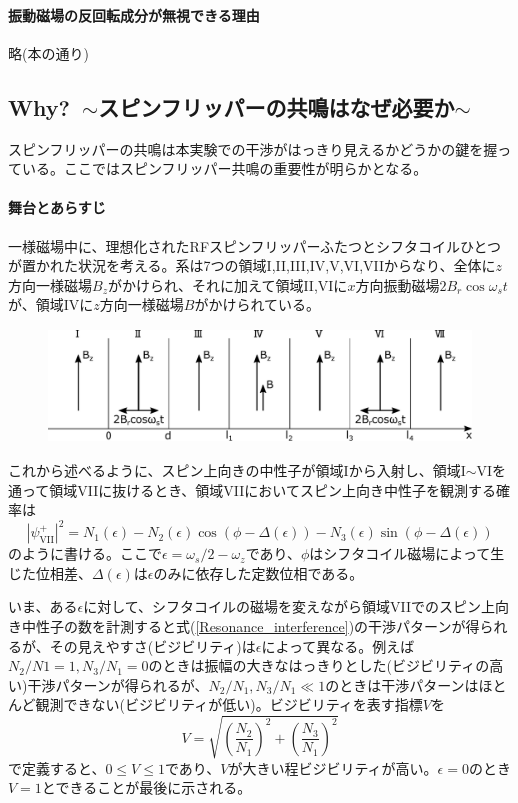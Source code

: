 \paragraph{振動磁場の反回転成分が無視できる理由}
略(本の通り)

\subsection{Why?\ $\sim$スピンフリッパーの共鳴はなぜ必要か$\sim$}
スピンフリッパーの共鳴は本実験での干渉がはっきり見えるかどうかの鍵を握っている。ここではスピンフリッパー共鳴の重要性が明らかとなる。

\paragraph{舞台とあらすじ}
一様磁場中に、理想化されたRFスピンフリッパーふたつとシフタコイルひとつが置かれた状況を考える。系は7つの領域I,II,III,IV,V,VI,VIIからなり、全体に$z$方向一様磁場$B_z$がかけられ、それに加えて領域II,VIに$x$方向振動磁場$2B_r\cos\omega_s t$が、領域IVに$z$方向一様磁場$B$がかけられている。
\begin{figure}[h]
\centering
\includegraphics[height=3cm]{resonance/whatwhyhow/Resonance_why_setting.pdf}
\end{figure}

これから述べるように、スピン上向きの中性子が領域Iから入射し、領域I$\sim$VIを通って領域VIIに抜けるとき、領域VIIにおいてスピン上向き中性子を観測する確率は
\begin{equation}
|\psi_\mathrm{VII}^+|^2=N_1(\epsilon)-N_2(\epsilon) \cos (\phi -\Delta(\epsilon)) -N_3(\epsilon) \sin(\phi-\Delta(\epsilon)) \label{Resonance_interference}
\end{equation}
のように書ける。ここで$\epsilon=\omega_s/2-\omega_z$であり、$\phi$はシフタコイル磁場によって生じた位相差、$\Delta(\epsilon)$は$\epsilon$のみに依存した定数位相である。

いま、ある$\epsilon$に対して、シフタコイルの磁場を変えながら領域VIIでのスピン上向き中性子の数を計測すると式(\ref{Resonance_interference})の干渉パターンが得られるが、その見えやすさ(ビジビリティ)は$\epsilon$によって異なる。例えば$N_2/N1=1,N_3/N_1=0$のときは振幅の大きなはっきりとした(ビジビリティの高い)干渉パターンが得られるが、$N_2/N_1,N_3/N_1 \ll 1$のときは干渉パターンはほとんど観測できない(ビジビリティが低い)。ビジビリティを表す指標$V$を
\begin{equation}
V=\sqrt{\left(\frac{N_2}{N_1}\right)^2+\left(\frac{N_3}{N_1}\right)^2}
\end{equation}
で定義すると、$0 \le V \le 1$であり、$V$が大きい程ビジビリティが高い。$\epsilon=0$のとき$V=1$とできることが最後に示される。

